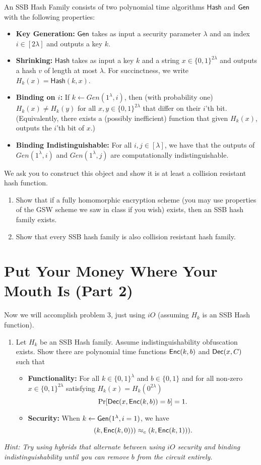 \documentclass[11pt]{article}
\newcommand{\zo}{\{0,1\}}
\newcommand{\iO}{iO}
\newcommand{\Hash}{\mathsf{Hash}}
\begin{document}
\begin{definition}
An SSB Hash Family consists of two polynomial time algorithms $\Hash$ and $\mathsf{Gen}$ with the following properties:
\begin{itemize}
    \item \textbf{Key Generation: }$\mathsf{Gen}$ takes as input a security parameter $\lambda$ and an index $i \in [2\lambda]$ and outputs a key $k$.
    \item \textbf{Shrinking:} $\Hash$ takes as input a key $k$ and a string $x \in \zo^{2\lambda}$ and outputs a hash $v$ of length at most $\lambda$. For succinctness, we write $H_k(x) = \Hash(k, x)$.
    \item \textbf{Binding on $i$:} If $k \gets Gen(1^\lambda, i)$, then (with probability one) $H_k(x) \neq H_k(y)$ for all $x, y \in \zo^{2\lambda}$ that differ on their $i$'th bit. (Equivalently, there exists a (possibly inefficient) function that given $H_k(x)$, outputs the $i$'th bit of $x$.)
     \item \textbf{Binding Indistinguishable:} For all $i, j \in [\lambda]$, we have that the outputs of $Gen(1^\lambda, i)$ and $Gen(1^\lambda, j)$ are computationally indistinguishable.
\end{itemize}
\end{definition}

We ask you to construct this object and show it is at least a collision resistant hash function.
\begin{enumerate}
    \item Show that if a fully homomorphic encryption scheme (you may use properties of the GSW scheme we saw in class if you wish) exists, then an SSB hash family exists.
    \item Show that every SSB hash family is also collision resistant hash family.
\end{enumerate}




\section{Put Your Money Where Your Mouth Is (Part 2)}

Now we will accomplish problem 3, just using $\iO$ (assuming $H_k$ is an SSB Hash function).

\begin{enumerate}
    \item Let $H_k$ be an SSB Hash family. Assume indistinguishability obfuscation exists. Show there are polynomial time functions $\mathsf{Enc}(k, b)$ and $\mathsf{Dec}(x, C)$ such that
    \begin{itemize}
        \item \textbf{Functionality:} For all $k \in \zo^\lambda$ and $b \in \zo$ and for all non-zero $x \in \zo^{2\lambda}$ satisfying $H_k(x) = H_k(0^{2\lambda})$
        \[\Pr[\mathsf{Dec}(x, \mathsf{Enc}(k, b)) = b] = 1.\]
        \item \textbf{Security:} When $k \leftarrow \mathsf{Gen}(1^\lambda, i = 1)$, we have
        \[(k, \mathsf{Enc}(k, 0))) \approx_c (k, \mathsf{Enc}(k, 1))).\]
    \end{itemize}
\end{enumerate}


\noindent
 \emph{Hint: Try using hybrids that alternate between using $\iO$ security and binding indistinguishability until you can remove $b$ from the circuit entirely.}
\end{document}
